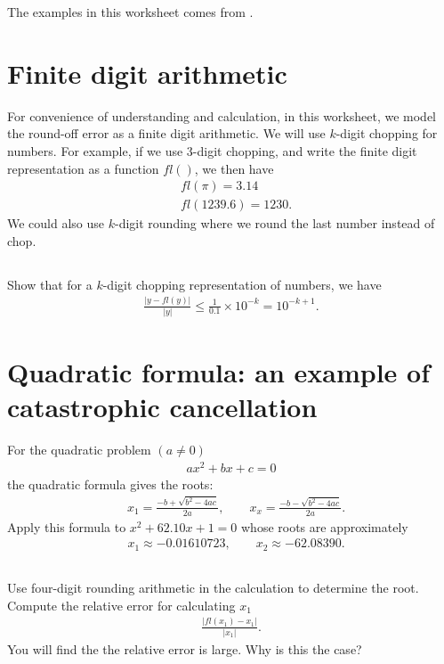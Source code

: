 \documentclass[11pt,letterpaper]{article}
\begin{document}
The examples in this worksheet comes from \cite[\S 1.2]{BurdenFaires_10}.

\section{Finite digit arithmetic}
For convenience of understanding and calculation, in this worksheet, we model the round-off error as a finite digit arithmetic. We will use $k$-digit chopping for numbers. For example, if we use 3-digit chopping, and write the finite digit representation as a function $fl()$, we then have
\begin{align*}
    &fl(\pi) = 3.14\\
    &fl(1239.6) = 1230. 
\end{align*}
We could also use $k$-digit rounding where we round the last number instead of chop.

\subsection{}
Show that for a $k$-digit chopping representation of numbers, we have
\begin{align*}
    \frac{|y-fl(y)|}{|y|}\leq \frac{1}{0.1}\times 10^{-k} = 10^{-k+1}.
\end{align*}


\section{Quadratic formula: an example of catastrophic cancellation}
For the quadratic problem $(a\neq 0)$
\begin{align*}
    ax^2+bx+c = 0
\end{align*}
the quadratic formula gives the roots:
\begin{align*}
    &x_1 = \frac{-b+\sqrt{b^2-4ac}}{2a}, \qquad x_x = \frac{-b-\sqrt{b^2-4ac}}{2a}.
\end{align*}
Apply this formula to $x^2+62.10x+1 = 0$ whose roots are approximately
\begin{align*}
    &x_1 \approx -0.01610723, \qquad x_2 \approx -62.08390.
\end{align*}

\subsection{}
Use four-digit rounding arithmetic in the calculation to determine the root. Compute the relative error for calculating $x_1$
\begin{align*}
    \frac{|fl(x_1)-x_1|}{|x_1|}.
\end{align*}
You will find the the relative error is large. Why is this the case?
\end{document}
